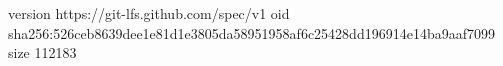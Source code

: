 version https://git-lfs.github.com/spec/v1
oid sha256:526ceb8639dee1e81d1e3805da58951958af6c25428dd196914e14ba9aaf7099
size 112183
